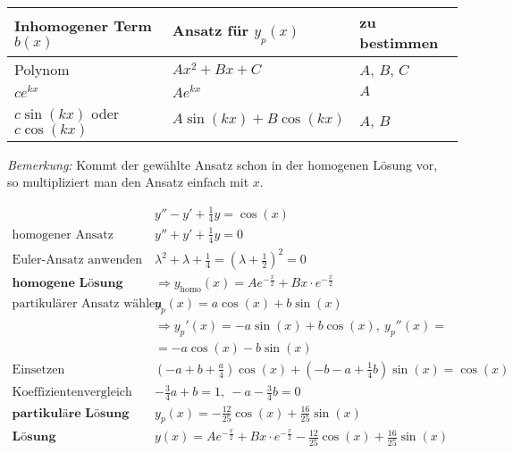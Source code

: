 \begin{table}[H]
	\centering
	\begin{tabular}{|l|l|l|}
		\hline
		\textbf{Inhomogener Term $b(x)$} & \textbf{Ansatz f{\"u}r $y_p(x)$}	& \textbf{zu bestimmen}		\\ \hline
		Polynom				& $Ax^2 + Bx + C$			& $A$, $B$, $C$		\\ \hline
		$c e^{k x}$ & $Ae^{kx}$					& $A$				\\ \hline
		$c\sin(kx)$ oder $c\cos(kx)$ & $A\sin(kx) + B\cos(kx)$ & $A$, $B$ \\ \hline
		
	\end{tabular}
\end{table}

\emph{Bemerkung:} Kommt der gew{\"a}hlte Ansatz schon in der homogenen L{\"o}sung vor,\\ so multipliziert man den Ansatz einfach mit $x$.

\begin{equation*}
\begin{split}
& y'' - y' + \frac{1}{4}y = \cos(x) \\
\text{homogener Ansatz}\quad & y'' + y' + \frac{1}{4}y = 0 \\
\text{Euler-Ansatz anwenden}\quad & \lambda^2 + \lambda + \frac{1}{4} = (\lambda + \frac{1}{2})^2 = 0 \\
\textbf{homogene L{\"o}sung}\quad &\Rightarrow y_\text{homo}(x) = Ae^{-\frac{x}{2}} + Bx \cdot e^{-\frac{x}{2}} \\
\text{partikul{\"a}rer Ansatz w{\"a}hlen}\quad & y_p(x) = a\cos(x) + b\sin(x) \\
& \Rightarrow y_p'(x) = -a\sin(x) + b\cos(x),\  y_p''(x) = \\ & = -a\cos(x) -b \sin(x) \\
\text{Einsetzen}\quad & (-a + b + \frac{a}{4})\cos(x) + (-b -a + \frac{1}{4}b)\sin(x) = \cos(x) \\
\text{Koeffizientenvergleich}\quad & -\frac{3}{4}a + b = 1,\ -a-\frac{3}{4}b = 0 \\
\textbf{partikul{\"a}re L{\"o}sung}\quad & y_p(x) = -\frac{12}{25}\cos(x) + \frac{16}{25}\sin(x) \\
\textbf{L{\"o}sung}\quad & y(x) = Ae^{-\frac{x}{2}} + Bx \cdot e^{-\frac{x}{2}} -\frac{12}{25}\cos(x) + \frac{16}{25}\sin(x)
\end{split}
\end{equation*}

